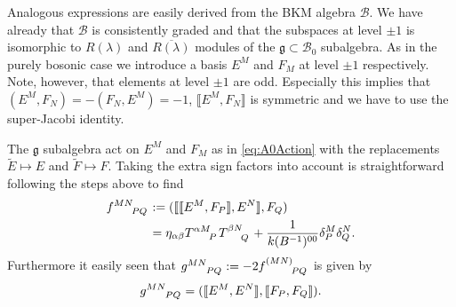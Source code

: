 Analogous expressions are easily derived from the BKM algebra $\mathscr{B}$. We have already that $\mathscr{B}$ is consistently graded and that the subspaces at level $\pm 1$ is isomorphic to $R(\lambda)$ and $\overbar{R(\lambda)}$ modules of the $\mathfrak{g}\subset\mathscr{B}_0$ subalgebra. As in the purely bosonic case we introduce a basis $E^M$ and $F_M$ at level $\pm 1$ respectively. Note, however, that elements at level $\pm 1$ are odd. Especially this implies that $(E^M,F_N)=-(F_N,E^M)=-1$, $\llbracket E^M,F_N\rrbracket$ is symmetric and we have to use the super-Jacobi identity. 

The $\mathfrak{g}$ subalgebra act on $E^M$ and $F_M$ as in \eqref{eq:A0Action} with the replacements $\tilde{E}\mapsto E$ and $\tilde{F}\mapsto F$. Taking the extra sign factors into account is straightforward following the steps above to find 
\begin{equation}
    \begin{aligned}
        \tensor{f}{^{MN}_{PQ}} &:= (\llbracket\llbracket E^M,F_P\rrbracket,E^N\rrbracket,F_Q)\\
                                &= \eta_{\alpha\beta}\tensor{T}{^{\alpha M}_P}\tensor{T}{^{\beta N}_Q}+\frac{1}{k(B^{-1})^{00}}\delta^M_P\delta^N_Q.
    \end{aligned}
\end{equation}
Furthermore it easily seen that $\tensor{g}{^{MN}_{PQ}}:=-2\tensor{f}{^{(MN)}_{PQ}}$ is given by
\begin{equation}
    \tensor{g}{^{MN}_{PQ}} = (\llbracket E^M,E^N\rrbracket,\llbracket F_P,F_Q\rrbracket). 
\end{equation}

